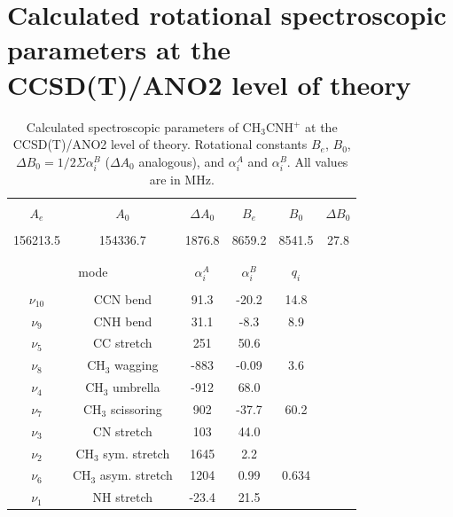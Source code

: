 \documentclass[preprint,12pt]{elsarticle}
\newcommand{\pa}{CH$_3$CNH$^+$ }
\begin{document}
\section*{Calculated rotational spectroscopic parameters at the CCSD(T)/ANO2 level of theory}

\begin{center}
    \begin{table}[h]
    \caption{Calculated spectroscopic parameters of \pa at the CCSD(T)/ANO2 level of theory. Rotational constants $B_e$, $B_0$, $\Delta B_0=1/2\Sigma \alpha^B_i$ ($\Delta A_0$ analogous), and $\alpha^A_i$ and $\alpha^B_i$. All values are in MHz.}
        \centering
        \begin{tabular}{cccccc}
            \hline\hline\\
            $A_e$    & $A_0$    &  $\Delta A_0$ & $B_e$  & $B_0$  & $\Delta B_0$  \\\hline\\
            156213.5 & 154336.7 & 1876.8        & 8659.2 & 8541.5 & 27.8            \\\\
            \hline\hline\\
            \multicolumn{2}{c}{mode}          & $\alpha^A_i$ & $\alpha ^B_i$ & $q_i$ & \\\hline\\
            $\nu_{10}$ & CCN bend             & 91.3  &  -20.2 & 14.8    &  \\
            $\nu_9$    & CNH bend             & 31.1  &  -8.3  & 8.9     &  \\
            $\nu_5$    & CC stretch           & 251   &  50.6  &         &  \\
            $\nu_8$    & CH$_3$ wagging       & -883  &  -0.09 & 3.6     &  \\
            $\nu_4$    & CH$_3$ umbrella      & -912  &  68.0  &         &  \\
            $\nu_7$    & CH$_3$ scissoring    & 902   &  -37.7 & 60.2    &  \\
            $\nu_3$    & CN stretch & 103     & 44.0  &        &            \\
            $\nu_2$    & CH$_3$ sym. stretch  & 1645  & 2.2    &         &  \\
            $\nu_6$    & CH$_3$ asym. stretch & 1204  & 0.99   & 0.634   &  \\
            $\nu_1$    & NH stretch           & -23.4 & 21.5   &         &  \\
            
            \hline\hline
        \end{tabular}
        \label{rot}
    \end{table}
\end{center}
\end{document}
